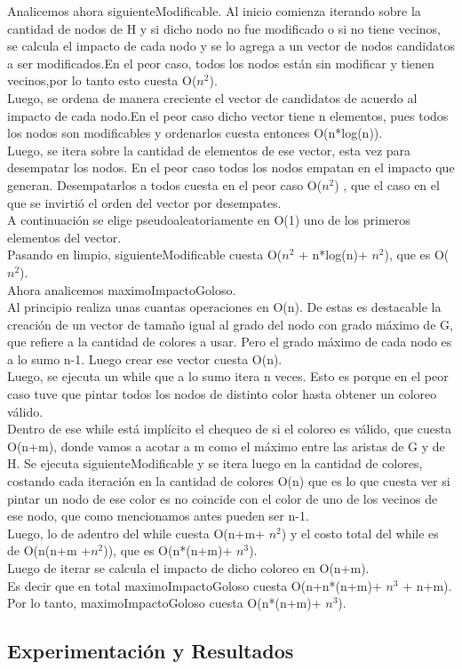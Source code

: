 \indent Analicemos ahora siguienteModificable. Al inicio comienza iterando sobre la cantidad de nodos de H y si dicho nodo no fue modificado o si no tiene vecinos, se calcula el impacto de cada nodo y se lo agrega a un vector de nodos candidatos a ser modificados.En el peor caso, todos los nodos están sin modificar y tienen vecinos,por lo tanto esto cuesta O($n^{2}$).\\
\indent Luego, se ordena de manera creciente el vector de candidatos de acuerdo al impacto de cada nodo.En el peor caso dicho vector tiene n elementos, pues todos los nodos son modificables y ordenarlos cuesta entonces O(n*log(n)).\\
\indent Luego, se itera sobre la cantidad de elementos de ese vector, esta vez para desempatar los nodos. En el peor caso todos los nodos empatan en el impacto que generan. Desempatarlos a todos cuesta en el peor caso O($n^{2}$) , que el caso en el que se invirtió el orden del vector por desempates.\\
\indent A continuación se elige pseudoaleatoriamente en O(1) uno de los primeros elementos del vector.\\
\indent Pasando en limpio, siguienteModificable cuesta O($n^2$ + n*log(n)+ $n^2$), que es O($n^{2}$).\\

\indent Ahora analicemos maximoImpactoGoloso.\\
\indent Al principio realiza unas cuantas operaciones en O(n). De estas es destacable la creación de un vector de tamaño igual al grado del nodo con grado máximo de G, que refiere a la cantidad de colores a usar. Pero el grado máximo de cada nodo es a lo sumo n-1. Luego crear ese vector cuesta O(n).\\
\indent Luego, se ejecuta un while que a lo sumo itera n veces. Esto es porque en el peor caso tuve que pintar todos los nodos de distinto color hasta obtener un coloreo válido.\\
\inden Dentro de ese while está implícito el chequeo de si el coloreo es válido, que cuesta O(n+m), donde vamos a acotar a m como el máximo entre las aristas de G y de H. Se ejecuta siguienteModificable y se itera luego en la cantidad de colores, costando cada iteración en la cantidad de colores O(n) que es lo que cuesta ver si pintar un nodo de ese color es no coincide con el color de uno de los vecinos de ese nodo, que como mencionamos antes pueden ser n-1.\\
\indent Luego, lo de adentro del while cuesta O(n+m+ $n^{2}$) y el costo total del while es de O(n(n+m +$n^{2}$)), que es O(n*(n+m)+ $n^{3}$).\\
\indent Luego de iterar se calcula el impacto de dicho coloreo en O(n+m).\\
\indent Es decir que en total maximoImpactoGoloso cuesta O(n+n*(n+m)+ $n^{3}$ + n+m).\\
\indent Por lo tanto, maximoImpactoGoloso cuesta O(n*(n+m)+ $n^{3}$).\\
 
\subsection{Experimentación y Resultados}
